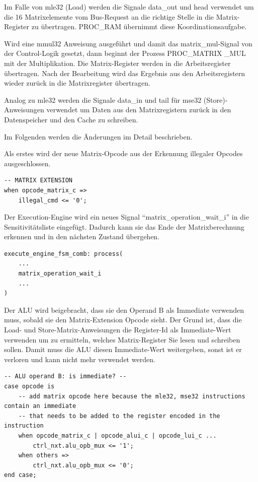 Im Falle von mle32 (Load) werden die Signale data\_out und head verwendet um die 16 Matrixelemente vom Bus-Request an die richtige Stelle in die Matrix-Register zu übertragen. PROC\_RAM übernimmt diese Koordinationsaufgabe.

Wird eine mmul32 Anweisung ausgeführt und damit das matrix\_mul-Signal von der Control-Logik gesetzt, dann beginnt der Prozess PROC\_MATRIX \_MUL mit der Multiplikation. Die Matrix-Register werden in die Arbeitsregister übertragen. Nach der Bearbeitung wird das Ergebnis aus den Arbeitsregistern wieder zurück in die Matrixregister übertragen.

Analog zu mle32 werden die Signale data\_in und tail für mse32 (Store)-Anweisungen verwendet um Daten aus den Matrixregistern zurück in den Datenspeicher und den Cache zu schreiben.

Im Folgenden werden die Änderungen im Detail beschrieben.

Als erstes wird der neue Matrix-Opcode aus der Erkennung illegaler Opcodes ausgeschlossen.

\begin{lstlisting}[style=VHDLStyle,caption={Test auf illegale Opcodes},captionpos=b]
-- MATRIX EXTENSION
when opcode_matrix_c =>
    illegal_cmd <= '0';
\end{lstlisting}

Der Execution-Engine wird ein neues Signal ``matrix\_operation\_wait\_i'' in die Sensitivitätsliste eingefügt. Dadurch kann sie das Ende der Matrixberechnung erkennen und in den nächsten Zustand übergehen.

\begin{lstlisting}[style=VHDLStyle,caption={Erweiterung der Sensitivitätsliste},captionpos=b]
execute_engine_fsm_comb: process(
    ...
    matrix_operation_wait_i
    ...
)
\end{lstlisting}

Der ALU wird beigebracht, dass sie den Operand B als Immediate verwenden muss, sobald sie den Matrix-Extension Opcode sieht. Der Grund ist, dass die Load- und Store-Matrix-Anweisungen die Register-Id als Immediate-Wert verwenden um zu ermitteln, welches Matrix-Register Sie lesen und schreiben sollen. Damit muss die ALU diesen Immediate-Wert weitergeben, sonst ist er verloren und kann nicht mehr verwendet werden.

\begin{lstlisting}[style=VHDLStyle,caption={Übernahme der Immediate-Parameter},captionpos=b]
-- ALU operand B: is immediate? --
case opcode is
    -- add matrix opcode here because the mle32, mse32 instructions contain an immediate
    -- that needs to be added to the register encoded in the instruction
    when opcode_matrix_c | opcode_alui_c | opcode_lui_c ...
        ctrl_nxt.alu_opb_mux <= '1';
    when others =>
        ctrl_nxt.alu_opb_mux <= '0';
end case;
\end{lstlisting}

